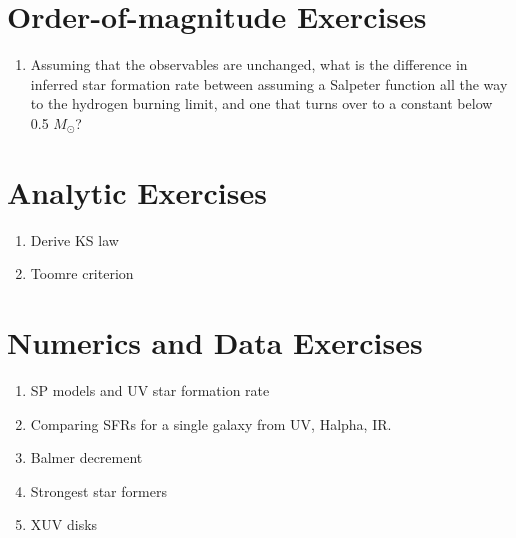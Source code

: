 \section{Order-of-magnitude Exercises}

\begin{enumerate} 
\item Assuming that the observables are unchanged, what is the
difference in inferred star formation rate between assuming a Salpeter
function all the way to the hydrogen burning limit, and one that turns
over to a constant below 0.5 $M_\odot$?
\end{enumerate}   

\section{Analytic Exercises}

\begin{enumerate}
\item Derive KS law
\item Toomre criterion
\end{enumerate}

\section{Numerics and Data Exercises}

\begin{enumerate}
\item SP models and UV star formation rate
\item Comparing SFRs for a single galaxy from UV, Halpha, IR.
\item Balmer decrement
\item Strongest star formers
\item XUV disks
\end{enumerate}


  
